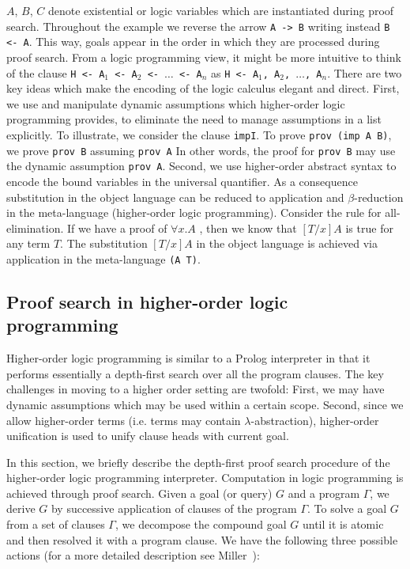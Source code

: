 \documentclass{llncs}
\newcommand{\z}{\mbox{}}
\begin{document}

$A$, $B$, $C$ denote existential or logic variables which are
instantiated during proof search. Throughout the example we reverse
the arrow {\tt{A -> B}} writing instead {\tt{B <- A}}. This way, goals
appear in the order in which they are processed during proof
search. From a logic programming view, it might be more intuitive to
think of the clause {\tt{H <- A$_1$ <- A$_2$ <- $\ldots$ <- A$_n$}} as
{\tt{H <- A$_1$, A$_2$, $\ldots$, A$_n$}}. There are two key ideas
which make the encoding of the logic calculus elegant and direct.
First, we use and manipulate dynamic assumptions which higher-order
logic programming provides, to eliminate the need to manage
assumptions in a list explicitly. To illustrate, we consider the
clause {\tt impI}. To prove {\tt prov (imp A B)}, we prove {\tt prov
B} assuming {\tt prov A} In other words, the proof for {\tt prov B}
may use the dynamic assumption {\tt prov A}.  Second, we use
higher-order abstract syntax to encode the bound variables in the
universal quantifier. As a consequence substitution in the object
language can be reduced to application and $\beta$-reduction in the
meta-language (higher-order logic programming). Consider the rule for
all-elimination. If we have a proof of $\forall x.A$ , then we know
that $[T/x]A$ is true for any term $T$. The substitution $[T/x]A$ in
the object language is achieved via application in the meta-language
{\tt (A T)}.


\subsection{Proof search in higher-order logic programming}

Higher-order logic programming is similar to a Prolog interpreter in
that it performs essentially a depth-first search over all the program
clauses. The key challenges in moving to a higher order setting are
twofold: First, we may have dynamic assumptions which may be
used within a certain scope. Second, since we allow higher-order
terms (i.e. terms may contain $\lambda$-abstraction), higher-order
unification is used to unify clause heads with current goal. 

In this section,  we briefly describe the depth-first proof search
procedure of the higher-order logic programming
interpreter. Computation in logic programming is achieved through
proof search. Given a goal (or query) $G$ and a program $\Gamma$, we
derive $G$ by successive application of clauses of the program
$\Gamma$. 
To solve a goal $G$ from a set of clauses $\Gamma$, we decompose the
compound goal $G$ until it is atomic and then resolved it with a
program clause. We have the following three possible actions (for a
more detailed description see Miller~\cite{Miller91apal}):
\end{document}
